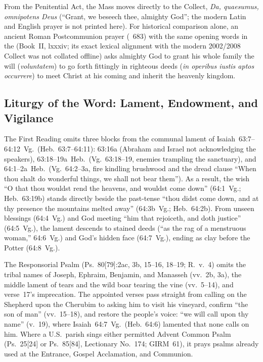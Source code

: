 From the Penitential Act, the Mass moves directly to the Collect, \emph{Da, quaesumus, omnipotens Deus} (``Grant, we beseech thee, almighty God''; the modern Latin and English prayer is not printed here). For historical comparison alone, an ancient Roman Postcommunion prayer (~683) with the same opening words in the  (Book~II, lxxxiv; its exact lexical alignment with the modern 2002/2008 Collect was not collated offline) asks almighty God to grant his whole family the will (\emph{voluntatem}) to go forth fittingly in righteous deeds (\emph{in operibus iustis aptos occurrere}) to meet Christ at his coming and inherit the heavenly kingdom.

\subsection{Liturgy of the Word: Lament, Endowment, and Vigilance}

The First Reading omits three blocks from the communal lament of Isaiah~63:7--64:12~Vg.\ (Heb.~63:7--64:11): 63:16a (Abraham and Israel not acknowledging the speakers), 63:18--19a~Heb.\ (Vg.~63:18--19, enemies trampling the sanctuary), and 64:1--2a~Heb.\ (Vg.~64:2--3a, fire kindling brushwood and the dread clause ``When thou shalt do wonderful things, we shall not bear them''). As a result, the wish ``O that thou wouldst rend the heavens, and wouldst come down'' (64:1~Vg.; Heb.~63:19b) stands directly beside the past-tense ``thou didst come down, and at thy presence the mountains melted away'' (64:3b~Vg.; Heb.~64:2b). From unseen blessings (64:4~Vg.) and God meeting ``him that rejoiceth, and doth justice'' (64:5~Vg.), the lament descends to stained deeds (``as the rag of a menstruous woman,'' 64:6~Vg.) and God's hidden face (64:7~Vg.), ending as clay before the Potter (64:8~Vg.).

The Responsorial Psalm (Ps.~80[79]:2ac, 3b, 15--16, 18--19; R.~v.~4) omits the tribal names of Joseph, Ephraim, Benjamin, and Manasseh (vv.~2b, 3a), the middle lament of tears and the wild boar tearing the vine (vv.~5--14), and verse~17's imprecation. The appointed verses pass straight from calling on the Shepherd upon the Cherubim to asking him to visit his vineyard, confirm ``the son of man'' (vv.~15--18), and restore the people's voice: ``we will call upon thy name'' (v.~19), where Isaiah~64:7~Vg.\ (Heb.~64:6) lamented that none calls on him. Where a U.S.\ parish sings either permitted Advent Common Psalm (Ps.~25[24] or Ps.~85[84], Lectionary No.~174; GIRM~61), it prays psalms already used at the Entrance, Gospel Acclamation, and Communion.

